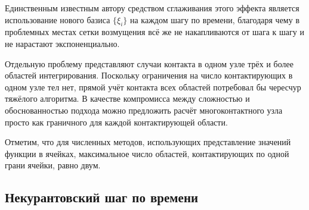 Единственным известным автору средством сглаживания этого эффекта является 
использование нового базиса $\{\xi_i\}$ на каждом шагу по времени, благодаря 
чему в проблемных местах сетки 
возмущения всё же не накапливаются от шага к шагу и не нарастают экспоненциально.

Отдельную проблему представляют случаи контакта в одном узле 
трёх и более областей интегрирования. Поскольку ограничения на 
число контактирующих в одном узле тел нет, 
прямой учёт контакта всех областей потребовал бы чересчур тяжёлого алгоритма. 
В качестве компромисса между сложностью и обоснованностью подхода можно предложить 
расчёт многоконтактного узла просто как граничного для каждой контактирующей области. 

Отметим, что для численных методов, использующих представление значений функции 
в ячейках, максимальное число областей, контактирующих по одной грани ячейки, равно двум. 


\subsection{Некурантовский шаг по времени}
